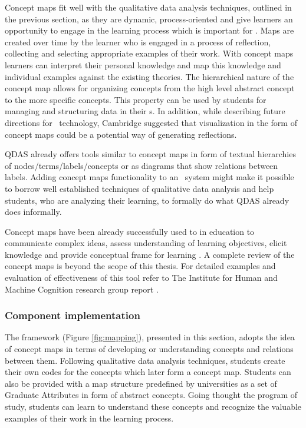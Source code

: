 Concept maps fit well with the qualitative data analysis techniques, outlined in
the previous section, as they are dynamic, process-oriented and give learners an
opportunity to engage in the learning process \citep{Mcaleese1998} which is
important for \LLLs \citep{Schuetze2006,Divjak2004}. Maps are created over time
by the learner who is engaged in a process of reflection, collecting and
selecting appropriate examples of their work. With concept maps learners can
interpret their personal knowledge and map this knowledge and individual
examples against the existing theories. The hierarchical nature of the concept
map allows for organizing concepts from the high level abstract concept to the
more specific concepts. This property can be used by students for managing and
structuring data in their \ep s. In addition, while describing future directions
for \ep~technology, Cambridge \citeyearpar{Cambridge2010} suggested that
visualization in the form of concept maps could be a potential way of generating
reflections.

QDAS already offers tools similar to concept maps in form of textual hierarchies
of nodes/terms/labels/concepts or as diagrams that show relations between
labels. Adding concept maps functionality to an \ep~system might make it
possible to borrow well established techniques of qualitative data analysis and
help students, who are analyzing their learning, to formally do what QDAS
already does informally. 

Concept maps have been already successfully used to in education to communicate
complex ideas, assess understanding of learning objectives, elicit knowledge and
provide conceptual frame for learning \citep{Novak2010}. A complete review of
the concept maps is beyond the scope of this thesis. For detailed examples and
evaluation of effectiveness of this tool refer to The Institute for Human and
Machine Cognition research group report \citep{Canas2003}.

\subsubsection{Component implementation}

The framework (Figure \ref{fig:mapping}), presented in this section, adopts the
idea of concept maps in terms of developing or understanding concepts and
relations between them. Following qualitative data analysis techniques, students
create their own codes for the concepts which later form a concept map. Students
can also be provided with a map structure predefined by universities as a set of
Graduate Attributes in form of abstract concepts. Going thought the program of
study, students can learn to understand these concepts and recognize the
valuable examples of their work in the learning process.

